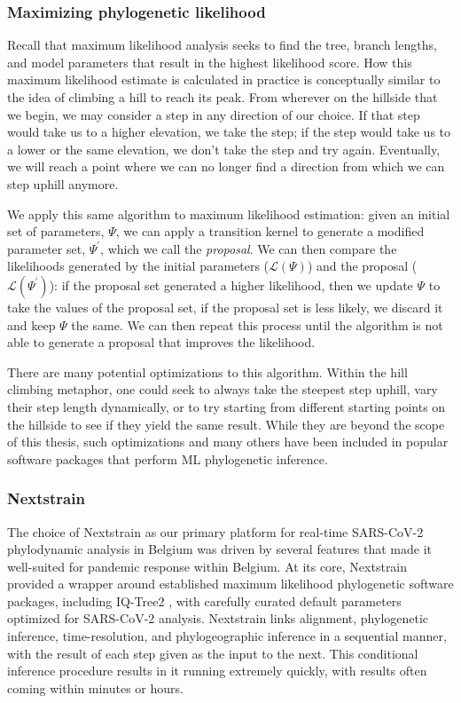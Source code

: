 \subsubsection{Maximizing phylogenetic likelihood}
Recall that maximum likelihood analysis seeks to find the tree, branch lengths, and model parameters that result in the highest likelihood score.
How this maximum likelihood estimate is calculated in practice is conceptually similar to the idea of climbing a hill to reach its peak.
From wherever on the hillside that we begin, we may consider a step in any direction of our choice.
If that step would take us to a higher elevation, we take the step; if the step would take us to a lower or the same elevation, we don't take the step and try again.
Eventually, we will reach a point where we can no longer find a direction from which we can step uphill anymore.

We apply this same algorithm to maximum likelihood estimation: given an initial set of parameters, $\Psi$, we can apply a transition kernel to generate a modified parameter set, $\Psi^{\prime}$, which we call the \textit{proposal}.
We can then compare the likelihoods generated by the initial parameters ($\mathcal{L}(\Psi)$) and the proposal ($\mathcal{L}(\Psi^{\prime})$): if the proposal set generated a higher likelihood, then we update $\Psi$ to take the values of the proposal set, if the proposal set is less likely, we discard it and keep $\Psi$ the same.
We can then repeat this process until the algorithm is not able to generate a proposal that improves the likelihood.

There are many potential optimizations to this algorithm.
Within the hill climbing metaphor, one could seek to always take the steepest step uphill, vary their step length dynamically, or to try starting from different starting points on the hillside to see if they yield the same result.
While they are beyond the scope of this thesis, such optimizations and many others have been included in popular software packages that perform ML phylogenetic inference.

\subsubsection{Nextstrain}
The choice of Nextstrain \citep{hadfield2018nextstrain} as our primary platform for real-time SARS-CoV-2 phylodynamic analysis in Belgium was driven by several features that made it well-suited for pandemic response within Belgium.
At its core, Nextstrain provided a wrapper around established maximum likelihood phylogenetic software packages, including IQ-Tree2 \citep{minh2020iq}, with carefully curated default parameters optimized for SARS-CoV-2 analysis.
Nextstrain links alignment, phylogenetic inference, time-resolution, and phylogeographic inference in a sequential manner, with the result of each step given as the input to the next.
This conditional inference procedure results in it running extremely quickly, with results often coming within minutes or hours.

